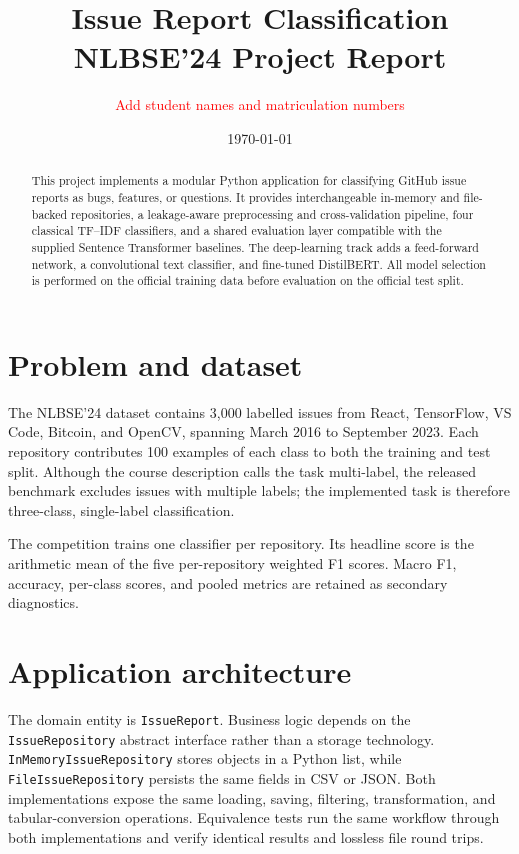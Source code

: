 \documentclass[11pt,a4paper]{article}
\title{Issue Report Classification\\\large NLBSE'24 Project Report}
\author{\textcolor{red}{Add student names and matriculation numbers}}
\date{\today}
\newcommand{\code}[1]{\texttt{#1}}
\begin{document}
\maketitle

\begin{abstract}
This project implements a modular Python application for classifying GitHub
issue reports as bugs, features, or questions. It provides interchangeable
in-memory and file-backed repositories, a leakage-aware preprocessing and
cross-validation pipeline, four classical TF--IDF classifiers, and a shared
evaluation layer compatible with the supplied Sentence Transformer baselines.
The deep-learning track adds a feed-forward network, a convolutional text
classifier, and fine-tuned DistilBERT. All model selection is performed on the
official training data before evaluation on the official test split.
\end{abstract}

\section{Problem and dataset}
The NLBSE'24 dataset contains 3,000 labelled issues from React, TensorFlow,
VS Code, Bitcoin, and OpenCV, spanning March 2016 to September 2023. Each
repository contributes 100 examples of each class to both the training and
test split. Although the course description calls the task multi-label, the
released benchmark excludes issues with multiple labels; the implemented task
is therefore three-class, single-label classification.

The competition trains one classifier per repository. Its headline score is
the arithmetic mean of the five per-repository weighted F1 scores. Macro F1,
accuracy, per-class scores, and pooled metrics are retained as secondary
diagnostics.

\section{Application architecture}
The domain entity is \code{IssueReport}. Business logic depends on the
\code{IssueRepository} abstract interface rather than a storage technology.
\code{InMemoryIssueRepository} stores objects in a Python list, while
\code{FileIssueRepository} persists the same fields in CSV or JSON. Both
implementations expose the same loading, saving, filtering, transformation,
and tabular-conversion operations. Equivalence tests run the same workflow
through both implementations and verify identical results and lossless file
round trips.
\end{document}
